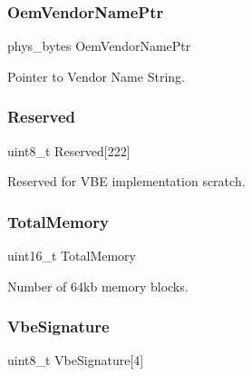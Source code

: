 \subsubsection{\texorpdfstring{Oem\+Vendor\+Name\+Ptr}{OemVendorNamePtr}}
{\footnotesize\ttfamily phys\+\_\+bytes Oem\+Vendor\+Name\+Ptr}



Pointer to Vendor Name String. 

\hypertarget{structvbe__info__block__t_a2c3b1cbb6bad5c51d4be4e57255a61d2}{}\label{structvbe__info__block__t_a2c3b1cbb6bad5c51d4be4e57255a61d2} 
\subsubsection{\texorpdfstring{Reserved}{Reserved}}
{\footnotesize\ttfamily uint8\+\_\+t Reserved\mbox{[}222\mbox{]}}



Reserved for V\+BE implementation scratch. 

\hypertarget{structvbe__info__block__t_a3e7b41e709394a10b3667e7f27f1aa7a}{}\label{structvbe__info__block__t_a3e7b41e709394a10b3667e7f27f1aa7a} 
\subsubsection{\texorpdfstring{Total\+Memory}{TotalMemory}}
{\footnotesize\ttfamily uint16\+\_\+t Total\+Memory}



Number of 64kb memory blocks. 

\hypertarget{structvbe__info__block__t_ae619d4d52ca296b56a18c6ec13d4899d}{}\label{structvbe__info__block__t_ae619d4d52ca296b56a18c6ec13d4899d} 
\subsubsection{\texorpdfstring{Vbe\+Signature}{VbeSignature}}
{\footnotesize\ttfamily uint8\+\_\+t Vbe\+Signature\mbox{[}4\mbox{]}}



